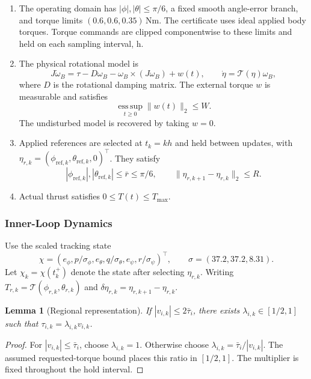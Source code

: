 \documentclass[12pt, a4paper]{article}
\newtheorem{lemma}{Lemma}
\begin{document}
\begin{enumerate}[
    label={Assumption \arabic*:},
    widest=4,
    leftmargin=*
]
\item[Assumption 1:]
The operating domain has $|\phi|,|\theta|\le\pi/6$, a fixed smooth
angle-error branch, and torque limits
$(0.6,0.6,0.35)\,\mathrm{Nm}$. The certificate uses ideal applied
body torques. Torque commands are clipped componentwise to these
limits and held on each sampling interval, h.

\item[Assumption 2:]
The physical rotational model is
\[
 J\dot{\omega}_B
 =\tau-D\omega_B-\omega_B\times(J\omega_B)+w(t),
 \qquad
 \dot{\eta}=\mathcal T(\eta)\omega_B,
\]
where $D$ is the rotational damping matrix. 
The external torque $w$ is measurable and satisfies
\[
 \operatorname*{ess\,sup}_{t\ge0}\lVert w(t)\rVert_2\le W.
\]
The undisturbed model is recovered by taking $w=0$.

\item[Assumption 3:]
Applied references are selected at $t_k=kh$ and held between updates,
with $\eta_{r,k}=(\phi_{\mathrm{ref},k},\theta_{\mathrm{ref},k},0)^\top$.
They satisfy
\[
 |\phi_{\mathrm{ref},k}|,|\theta_{\mathrm{ref},k}|
 \le\bar r\le\pi/6,
 \qquad
 \lVert\eta_{r,k+1}-\eta_{r,k}\rVert_2\le R.
\]


\item[Assumption 4:]
Actual thrust satisfies $0\le T(t)\le T_{\max}$.
\end{enumerate}

\subsubsection{Inner-Loop Dynamics}
\label{sec:inner_loop}
\label{uhrc:sec:sampled}

Use the scaled tracking state
\begin{equation}
 \chi=(e_\phi,p/\sigma_\phi,e_\theta,q/\sigma_\theta,
                 e_\psi,r/\sigma_\psi)^\top,\qquad
 \sigma=(37.2,37.2,8.31).
 \label{uhrc:eq:scaled-state}
\end{equation}
Let $\chi_k=\chi(t_k^+)$ denote the state after selecting $\eta_{r,k}$.
Writing
$T_{r,k}=\mathcal T(\phi_{r,k},\theta_{r,k})$ and
$\delta\eta_{r,k}=\eta_{r,k+1}-\eta_{r,k}$.

\begin{lemma}[Regional representation]
\label{uhrc:lem:sector}
If $|v_{i,k}|\le2\bar\tau_i$, there exists
$\lambda_{i,k}\in[1/2,1]$ such that
$\tau_{i,k}=\lambda_{i,k}v_{i,k}$.
\end{lemma}
\begin{proof}
For $|v_{i,k}|\le\bar\tau_i$, choose $\lambda_{i,k}=1$.
Otherwise choose $\lambda_{i,k}=\bar\tau_i/|v_{i,k}|$.
The assumed requested-torque bound places this ratio in $[1/2,1]$.
The multiplier is fixed throughout the hold interval.
\end{proof}
\end{document}
